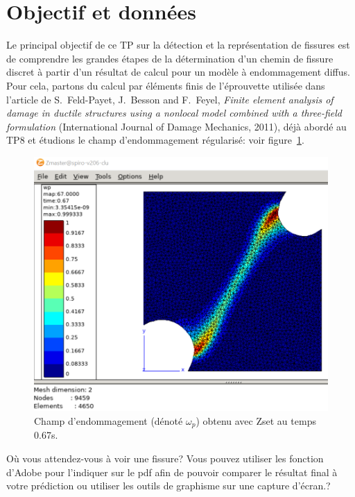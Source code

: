 \documentclass[french,12pt]{exam}
\begin{document}
\thispagestyle{empty}

\section{Objectif et données}
Le principal objectif de ce TP sur la détection et la représentation de fissures est de comprendre les grandes étapes de la détermination d'un chemin de fissure discret à partir d'un résultat de calcul pour un modèle à endommagement diffus. Pour cela, partons du calcul par éléments finis de l'éprouvette utilisée dans l'article de S.~Feld-Payet, J.~Besson and F.~Feyel,  \emph{Finite element analysis of damage in ductile structures using a nonlocal model combined with a three-field formulation} (International Journal of Damage Mechanics, 2011), déjà abordé au TP8 et étudions le champ d'endommagement régularisé: voir figure~\ref{fig:zset}.\\
\begin{figure}[!htb]
\centering
\includegraphics[height=.5\textheight]{calcul_zset.PNG}
\caption{Champ d'endommagement (dénoté $\omega _p$) obtenu avec Zset au temps 0.67s.}
\label{fig:zset}
\end{figure}

\begin{questions}
\question Où vous attendez-vous à voir une fissure? Vous pouvez utiliser les fonction d'Adobe pour l'indiquer sur le pdf afin de pouvoir comparer le résultat final à votre prédiction ou utiliser les outils de graphisme sur une capture d'écran.?
\end{questions}
\end{document}
